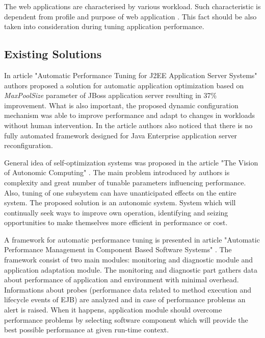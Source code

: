 \documentclass[12pt,a4paper]{article}
\begin{document}
The web applications are characterised by various workload. Such characteristic is dependent from profile and purpose of web application \cite{invariantsworkloads}. This fact should be also taken into consideration during tuning application performance. 

\subsection{Existing Solutions} \label{ExistingSolutions}
In article "Automatic Performance Tuning for J2EE Application Server Systems" \cite{autotuning} authors proposed a solution for automatic application optimization based on \textit{MaxPoolSize} parameter of JBoss application server resulting in 37\% improvement. What is also important, the proposed dynamic configuration  mechanism  was able to improve  performance  and  adapt  to  changes  in  workloads without human intervention. In the article authors also noticed that there is no fully automated framework designed for Java Enterprise application server reconfiguration.

General idea of self-optimization systems was proposed in the article "The Vision of Autonomic Computing" \cite{autoarch}. The main problem introduced by authors is complexity and great number of tunable parameters influencing performance. Also, tuning of one subsystem can have unanticipated effects on the entire system. The proposed solution is an autonomic system. System which will continually seek ways to improve own operation, identifying and seizing opportunities to make themselves more efficient in performance or cost. 

A framework for automatic performance tuning is presented in article "Automatic Performance Management in Component Based Software Systems" \cite{autoframework}. The framework consist of two main modules: monitoring and diagnostic module and application adaptation module. The monitoring and diagnostic part gathers data about performance of application and environment with minimal overhead. Informations about probes (performance data related to method execution and lifecycle
events of EJB) are analyzed and in case of performance problems an alert is raised. When it happens, application module should overcome performance problems by selecting software component which will provide the best possible performance at given run-time context. 
\end{document}
